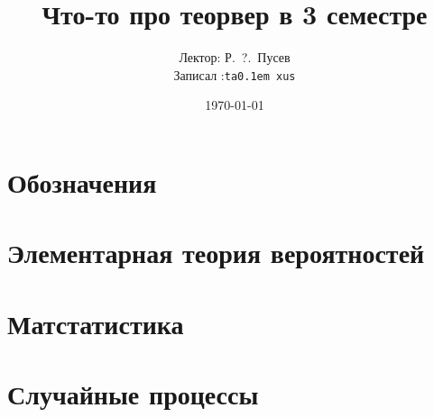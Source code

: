 \documentclass[12pt,timbord]{../notes}
\title{Что-то про теорвер в 3 семестре}
\date{\today}
\author{Лектор: Р.~?.~Пусев \\
Записал :\texttt{ta\lower 0.1em \hbox{x}us}}
\begin{document}
 
\maketitle
\tableofcontents
\clearpage

\chapter{Обозначения}

\chapter{Элементарная теория вероятностей}

\chapter{Матстатистика}

\chapter{Случайные процессы}






\end{document}
